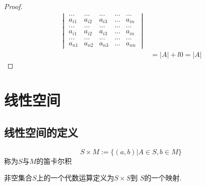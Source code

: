 \documentclass[blue,normal,cn]{elegantnote}
\begin{document}
\begin{proof}
\begin{equation*}
\begin{aligned}
\begin{vmatrix}
                ...&...&...&...&...\\
                a_{i1}&a_{i2} & a_{i3} &...& a_{in}\\
                ...&...&...&...&...\\
                a_{i1}&a_{i2} & a_{i3} &...& a_{in}\\
                ...&...&...&...&...\\
                a_{n1}&a_{n2} & a_{n3} &...& a_{nn}
                \end{vmatrix}
                \\
        &=|A|+l0=|A|
        \end{aligned}
        \end{equation*}


\end{proof}

\section{线性空间}
\subsection{线性空间的定义}

\begin{definition}
    $$S\times M:=\{(a,b)|A∈ S,b ∈ M\}$$
称为$S$与$M$的笛卡尔积
\end{definition}

\begin{definition}
   非空集合$S$上的一个代数运算定义为$S\times S$到 $S$的一个映射.
\end{definition}
\end{document}
